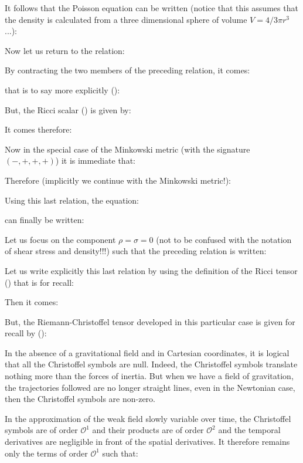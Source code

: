 	It follows that the Poisson equation can be written (notice that this assumes that the density is calculated from a three dimensional sphere of volume $V=4/3\pi r^3$...):
	
	Now let us return to the relation:
	
	By contracting the two members of the preceding relation, it comes:
	
	that is to say more explicitly ():
	
	But, the Ricci scalar () is given by:
	
	It comes therefore:
	
	Now in the special case of the Minkowski metric (with the signature $(-, +, +, +)$) it is immediate that:
	
	Therefore (implicitly we continue with the Minkowski metric!):
	
	Using this last relation, the equation:
	
	can finally be written:
	
	Let us focus on the component $\rho=\sigma=0$ (not to be confused with the notation of shear stress and density!!!) such that the preceding relation is written:
	
	Let us write explicitly this last relation by using the definition of the Ricci tensor () that is for recall:
	
	Then it comes:
	
	But, the Riemann-Christoffel tensor developed in this particular case is given for recall by ():
	
	\begin{tcolorbox}[title=Remark,colframe=black,arc=10pt]
	In the absence of a gravitational field and in Cartesian coordinates, it is logical that all the Christoffel symbols are null. Indeed, the Christoffel symbols translate nothing more than the forces of inertia. But when we have a field of gravitation, the trajectories followed are no longer straight lines, even in the Newtonian case, then the Christoffel symbols are non-zero.
	\end{tcolorbox}
	In the approximation of the weak field slowly variable over time, the Christoffel symbols are of order $\mathcal{O}^1$ and their products are of order $\mathcal{O}^2$ and the temporal derivatives are negligible in front of the spatial derivatives. It therefore remains only the terms of order $\mathcal{O}^1$ such that:
	
